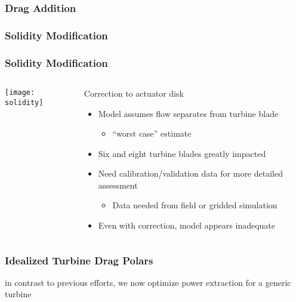 \documentclass[mathserif]{beamer}
\begin{document}
\begin{frame}
\frametitle{Drag Addition}

\end{frame}

%
%
\begin{frame}
 \frametitle{Solidity Modification}

\end{frame}

%
%
\begin{frame}
 \frametitle{Solidity Modification}


 \begin{columns}[]
  \begin{column}{0.55\linewidth}


   \begin{center}
    \texttt{[image: solidity]}
   \end{center}

  \end{column}
  \begin{column}{0.45\linewidth}
   
   \begin{block}{Correction to actuator disk}
    \begin{itemize}
     \item Model assumes flow separates from turbine blade
	   \begin{itemize}
	    \item ``worst case'' estimate
	   \end{itemize}
     \item Six and eight turbine blades greatly impacted
     \item Need calibration/validation data for more detailed assessment  
	   \begin{itemize}
	    \item Data needed from field or gridded simulation
	   \end{itemize}
     \item Even with correction, model appears inadequate
    \end{itemize}

   \end{block}
  \end{column}
 \end{columns}

\end{frame}



%
%
\begin{frame}
 \frametitle{Idealized Turbine Drag Polars}

in contrast to previous efforts, 
we now optimize power extraction for a generic turbine

\end{frame}
\end{document}

